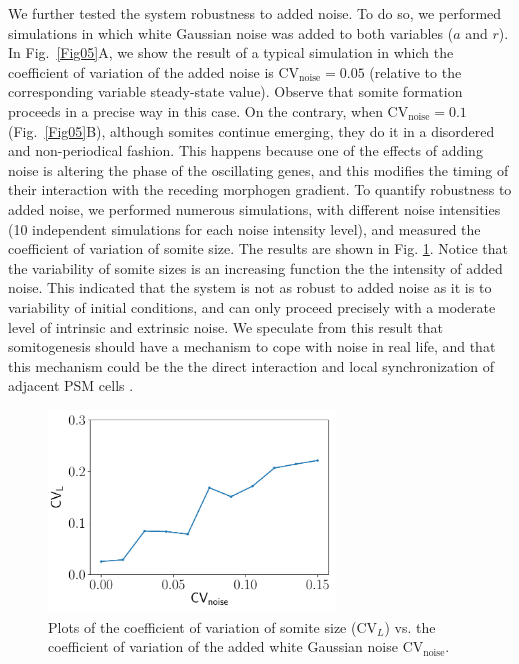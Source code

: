 \documentclass[%
 preprint,
 aip, 
 amsmath,amssymb,
]{revtex4-2}
\begin{document}
We further tested the system robustness to added noise. To do so, we performed simulations in which white Gaussian noise was added to both variables ($a$ and $r$). In Fig.~\ref{Fig05}A, we show the result of a typical simulation in which the coefficient of variation of the added noise is $\text{CV}_{\text{noise}}= 0.05$ (relative to the corresponding variable steady-state value). Observe that somite formation proceeds in a precise way in this case. On the contrary, when $\text{CV}_{\text{noise}} = 0.1$ (Fig.~\ref{Fig05}B), although somites continue emerging, they do it in a disordered and non-periodical fashion. This happens because one of the effects of adding noise is altering the phase of the oscillating genes, and this modifies the timing of their interaction with the receding morphogen gradient. To quantify robustness to added noise, we performed numerous simulations, with different noise intensities (10 independent simulations for each noise intensity level), and measured the coefficient of variation of somite size. The results are shown in Fig. \ref{Fig06_2}. Notice that the variability of somite sizes is an increasing function the the intensity of added noise. This indicated that the system is not as robust to added noise as it is to variability of initial conditions, and can only proceed precisely with a moderate level of intrinsic and extrinsic noise. We speculate from this result that somitogenesis should have a mechanism to cope with noise in real life, and that this mechanism could be the the direct interaction and local synchronization of adjacent PSM cells \cite{PantojaHernndez2021}.

\begin{figure}
	\centering
	\includegraphics[width=3in]{Fig08}
	\caption{Plots of the coefficient of variation of somite size ($\text{CV}_L$) vs. the coefficient of variation of the added white Gaussian noise $\text{CV}_{\text{noise}}$.}
	\label{Fig06_2}
\end{figure}
\end{document}
